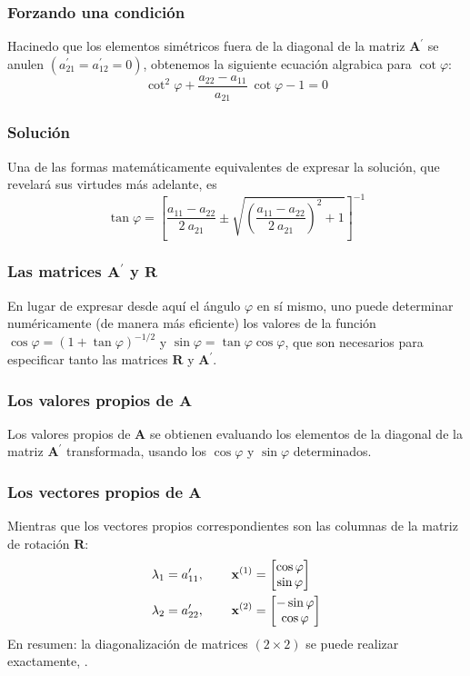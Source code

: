 \begin{frame}
\frametitle{Forzando una condición}
Hacinedo que los elementos simétricos fuera de la diagonal de la matriz $\mathbf{A}^{\prime}$ se anulen $(a^{\prime}_{21} = a^{\prime}_{12} = 0)$, obtenemos la siguiente ecuación algrabica para $\cot \varphi$:
\[ \cot^{2} \varphi + \dfrac{a_{22} - a_{11}}{a_{21}} \: \cot \varphi - 1 =0 \]
\end{frame}
\begin{frame}
\frametitle{Solución}
Una de las formas matemáticamente equivalentes de expresar la solución, que revelará sus virtudes más adelante, es
\[ \tan \varphi = \left[ \dfrac{a_{11} - a_{22}}{2 \: a_{21}} \pm \sqrt{\left(\dfrac{a_{11} - a_{22}}{2 \: a_{21}} \right)^{2} + 1} \right]^{-1} \]
\end{frame}
\begin{frame}
\frametitle{Las matrices $\mathbf{A^{\prime}}$ y $\mathbf{R}$}
En lugar de expresar desde aquí el ángulo $\varphi$ en sí mismo, uno puede determinar numéricamente (de manera más eficiente) los valores de la función $\cos \varphi = (1 + \tan \varphi)^{-1/2}$ y $\sin \varphi = \tan \varphi \cos \varphi$, que son necesarios para especificar tanto las matrices $\mathbf{R}$ y $\mathbf{A}^{\prime}$.
\end{frame}
\begin{frame}
\frametitle{Los valores propios de $\mathbf{A}$}
Los valores propios de $\mathbf{A}$ se obtienen evaluando los elementos de la diagonal de la matriz $\mathbf{A}^{\prime}$ transformada, usando los $\cos \varphi$ y $\sin \varphi$ determinados.
\end{frame}
\begin{frame}
\frametitle{Los vectores propios de $\mathbf{A}$}
Mientras que los vectores propios correspondientes son las columnas de la matriz de rotación $\mathbf{R}$:    
\begin{align*}
\lambda_{1} &= a^{\prime}_{11}, \hspace{0.75cm} \mathbf{x}^{(1)} = \begin{bmatrix} \cos \varphi \\ \sin \varphi \end{bmatrix} \\
\lambda_{2} &= a^{\prime}_{22}, \hspace{0.75cm} \mathbf{x}^{(2)} = \begin{bmatrix} - \sin \varphi \\ \cos \varphi \end{bmatrix}
\end{align*}
\pause
En resumen: la diagonalización de matrices $(2 \times 2)$ se puede realizar exactamente, .
\end{frame}
